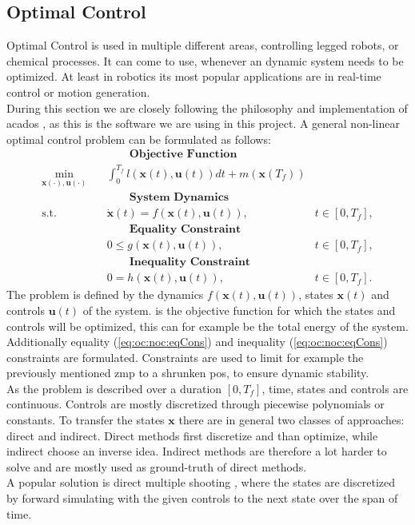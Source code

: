 \subsection{Optimal Control} \label{sec:fundamentals:optimalControl}
Optimal Control is used in multiple different areas, controlling legged robots, or chemical processes.
It can come to use, whenever an dynamic system needs to be optimized.
At least in robotics its most popular applications are in real-time control or motion generation.
\\
During this section we are closely following the philosophy and implementation of acados \cite{verschueren_2021}, as this is the software we are using in this project.
A general non-linear optimal control problem can be formulated as follows:
\begin{subequations}
  \label{eq:oc:noc}
  \begin{align}
    & \qquad \textbf{Objective Function} \nonumber \\
    \min_{\bm x(\cdot),\bm u(\cdot)} \quad
      & \int_0^{T_f} l\left(\bm x(t), \bm u(t)\right) dt
      + m(\bm x(T_f)) \label{eq:oc:noc:obj} \\
    & \qquad \textbf{System Dynamics} \nonumber \\
    \textrm{s.t.} \quad & \bm{\dot x}(t) = f(\bm x(t),\bm u(t)), & t \in \left[0,T_f \right], \label{eq:oc:noc:dyn} \\
    & \qquad \textbf{Equality Constraint} \nonumber \\
    & 0 \leq g(\bm x(t),\bm u(t)), & t \in \left[0,T_f \right], \label{eq:oc:noc:eqCons} \\
    & \qquad \textbf{Inequality Constraint} \nonumber \\
    & 0 = h(\bm x(t),\bm u(t)), & t \in \left[0,T_f \right]. \label{eq:oc:noc:ineqCons}
  \end{align}
\end{subequations}
The problem is defined by the dynamics $f(\bm x(t),\bm u(t))$, states $\bm x(t)$ and controls $\bm u(t)$ of the system.
 is the objective function for which the states and controls will be optimized, this can for example be the total energy of the system.
Additionally equality (\cref{eq:oc:noc:eqCons}) and inequality (\cref{eq:oc:noc:eqCons}) constraints are formulated.
Constraints are used to limit for example the previously mentioned \acrshort{zmp} to a shrunken \acrshort{pos}, to ensure dynamic stability.
\\
As the problem is described over a duration $\left[0,T_f\right]$, time, states and controls are continuous.
Controls are mostly discretized through piecewise polynomials or constants.
To transfer the states $\bm x$ there are in general two classes of approaches: direct and indirect.
Direct methods first discretize and than optimize, while indirect choose an inverse idea.
Indirect methods are therefore a lot harder to solve and are mostly used as ground-truth of direct methods.
\\
A popular solution is direct multiple shooting \cite{bock_1984}, where the states are discretized by forward simulating with the given controls to the next state over the span of time.


